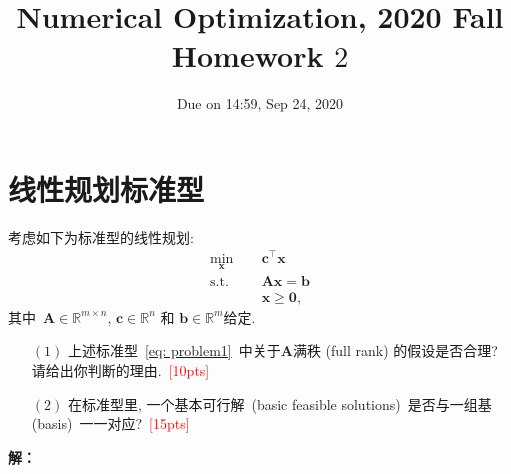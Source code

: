 \documentclass[10pt]{article}
\begin{document}
	
\title{	Numerical Optimization, 2020 Fall\\Homework $2$}
\date{Due on 14:59, Sep 24, 2020\\}
\maketitle


\section{线性规划标准型}
考虑如下为标准型的线性规划:
\begin{equation}\label{eq: problem1}
	\begin{aligned}
		\min_{\bm{x}}~\quad&\bm{c}^{\top}\bm{x}\\
		\textrm{s.t.}~\quad&\bm{A}\bm{x} = \bm{b}\\
		&\bm{x}\geq \bm{0},
	\end{aligned}
\end{equation}
其中~$\bm{A}\in\mathbb{R}^{m\times n}$, $\bm{c}\in\mathbb{R}^{n}$ 和 $\bm{b}\in\mathbb{R}^{m}$给定.
\begin{itemize}
	\item[$(1)$] 上述标准型~\eqref{eq: problem1}~中关于$\bm{A}$满秩 (full rank) 的假设是否合理? 请给出你判断的理由.~\textcolor{red}{[10pts]}
	
	\item[$(2)$] 在标准型里, 一个基本可行解~(basic feasible solutions)~是否与一组基 (basis)~一一对应?~\textcolor{red}{[15pts]}
\end{itemize}
\textbf{解：}
\end{document}
